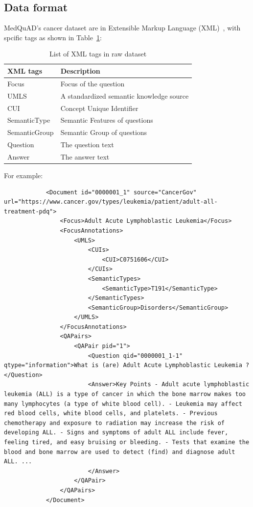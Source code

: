  
 	\subsection*{Data format}
 		MedQuAD's cancer dataset are in Extensible Markup Language (XML)~\cite{MedQuAD-Cancer-dataset}, with spcific tags as shown in Table~\ref{tab:xml-tag}:
 		 	\begin{table}[ht]
 			\caption{List of XML tags in raw dataset}
 			\label{tab:xml-tag}
 			\begin{tabular}{ll}
 				\toprule
 				XML tags&Description\\
 				\midrule
 				Focus & Focus of the question\\
 				UMLS & A standardized semantic knowledge source\\
 				CUI & Concept Unique Identifier \\
 				SemanticType &  Semantic Features of questions \\
 				SemanticGroup & Semantic Group of questions\\
 				Question & The question text\\
 				Answer & The answer text\\
 				\bottomrule
 			\end{tabular}
 		\end{table}
 		
	 	For example:
	 	\begin{lstlisting}
	 		<Document id="0000001_1" source="CancerGov" url="https://www.cancer.gov/types/leukemia/patient/adult-all-treatment-pdq">
	 			<Focus>Adult Acute Lymphoblastic Leukemia</Focus>
	 			<FocusAnnotations>
 					<UMLS>
				 		<CUIs>
				 			<CUI>C0751606</CUI>
				 		</CUIs>
				 		<SemanticTypes>
				 			<SemanticType>T191</SemanticType>
				 		</SemanticTypes>
				 		<SemanticGroup>Disorders</SemanticGroup>
		 			</UMLS>
	 			</FocusAnnotations>
	 			<QAPairs>
		 			<QAPair pid="1">
			 			<Question qid="0000001_1-1" qtype="information">What is (are) Adult Acute Lymphoblastic Leukemia ?</Question>
			 			<Answer>Key Points - Adult acute lymphoblastic leukemia (ALL) is a type of cancer in which the bone marrow makes too many lymphocytes (a type of white blood cell). - Leukemia may affect red blood cells, white blood cells, and platelets. - Previous chemotherapy and exposure to radiation may increase the risk of developing ALL. - Signs and symptoms of adult ALL include fever, feeling tired, and easy bruising or bleeding. - Tests that examine the blood and bone marrow are used to detect (find) and diagnose adult ALL. ...
			 			</Answer>
	 				</QAPair>
	 			</QAPairs>
	 		</Document>
	 	\end{lstlisting}
		
